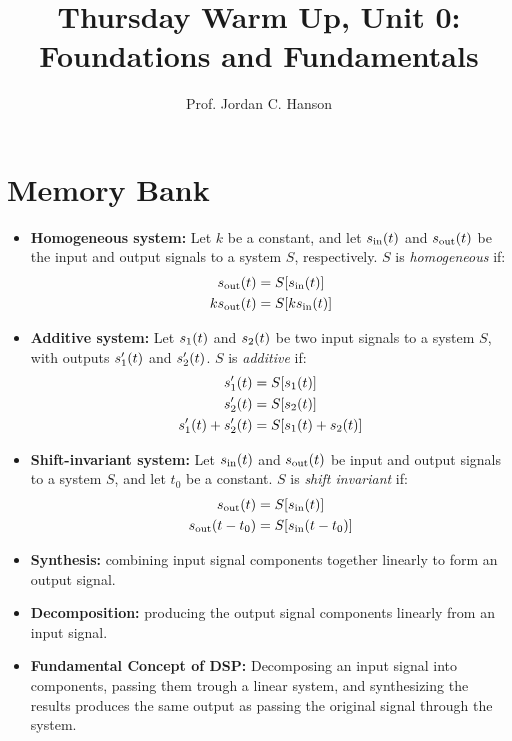 \documentclass{article}
\begin{document}
\twocolumn

\title{Thursday Warm Up, Unit 0: Foundations and Fundamentals}
\author{Prof. Jordan C. Hanson}
\maketitle

\section{Memory Bank}
\small
\begin{itemize}
\item \textbf{Homogeneous system:} Let $k$ be a constant, and let $s_{\rm in}(t)$ and $s_{\rm out}(t)$ be the input and output signals to a system $S$, respectively.  $S$ is \textit{homogeneous} if:
\begin{align}
s_{\rm out}(t) &= S[s_{\rm in}(t)] \\
k s_{\rm out}(t) &= S[k s_{\rm in}(t)]
\end{align}
\item \textbf{Additive system:} Let $s_{\rm 1}(t)$ and $s_{\rm 2}(t)$ be two input signals to a system $S$, with outputs $s'_{\rm 1}(t)$ and $s'_{\rm 2}(t)$.  $S$ is \textit{additive} if:
\begin{align}
s'_{\rm 1}(t) &= S[s_{\rm 1}(t)] \\
s'_{\rm 2}(t) &= S[s_{\rm 2}(t)] \\
s'_{\rm 1}(t)+s'_{\rm 2}(t) &= S[s_{\rm 1}(t)+s_{\rm 2}(t)]
\end{align}
\item \textbf{Shift-invariant system:} Let $s_{\rm in}(t)$ and $s_{\rm out}(t)$ be input and output signals to a system $S$, and let $t_0$ be a constant.  $S$ is \textit{shift invariant} if:
\begin{align}
s_{\rm out}(t) &= S[s_{\rm in}(t)] \\
s_{\rm out}(t-t_0) &= S[s_{\rm in}(t-t_0)] \\
\end{align}
\item \textbf{Synthesis:} combining input signal components together linearly to form an output signal.
\item \textbf{Decomposition:} producing the output signal components linearly from an input signal.
\item \textbf{Fundamental Concept of DSP:} Decomposing an input signal into components, passing them trough a linear system, and synthesizing the results produces the same output as passing the original signal through the system.

\end{itemize}
\end{document}
